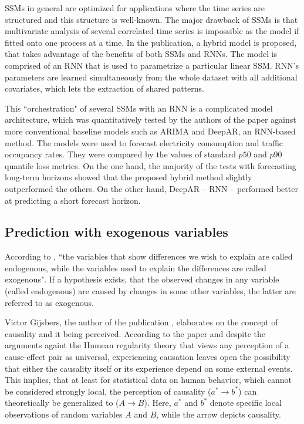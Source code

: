 \documentclass[3p,times,procedia]{elsarticle}
\begin{document}
\begin{enumerate}
SSMs in general are optimized for applications where the time series are structured and this structure is well-known. The major drawback of SSMs is that multivariate analysis of several correlated time series is impossible as the model if fitted onto one process at a time. In the publication, a hybrid model is proposed, that takes advantage of the benefits of both SSMs and RNNs. The model is comprised of an RNN that is used to parametrize a particular linear SSM. RNN's parameters are learned simultaneously from the whole dataset with all additional covariates, which lets the extraction of shared patterns.

This ``orchestration" of several SSMs with an RNN is a complicated model architecture, which was quantitatively tested by the authors of the paper \cite{rangapuram2018deep} against more conventional baseline models such as ARIMA and DeepAR, an RNN-based method. The models were used to forecast electricity consumption and traffic occupancy rates. They were compared by the values of standard $p50$ and $p90$ quantile loss metrics. On the one hand, the majority of the tests with forecasting long-term horizons showed that the proposed hybrid method slightly outperformed the others. On the other hand, DeepAR -- RNN -- performed better at predicting a short forecast horizon.
\end{enumerate}

\subsection{Prediction with exogenous variables} \label{pwev}

According to \cite{smelser2001international}, ``the variables that show differences we wish to explain are called endogenous, while the variables used to explain the differences are  called exogenous". If a hypothesis exists, that the observed changes in any variable (called endogenous) are caused by changes in some other variables, the latter are referred to as exogenous.

Victor Gijsbers, the author of the publication \cite{gijsbers2021perceiving}, elaborates on the concept of causality and it being perceived. According to the paper and despite the arguments againt the Humean regularity theory that views any perception of a cause-effect pair as universal, experiencing causation leaves open the possibility that either the causality itself or its experience depend on some external events. This implies, that at least for statistical data on human behavior, which cannot be considered strongly local, the perception of causality ($a^* \to b^*$) can theoretically be generalized to ($A \to B$). Here, $a^*$ and $b^*$ denote specific local observations of random variables $A$ and $B$, while the arrow depicts causality.
\end{document}
